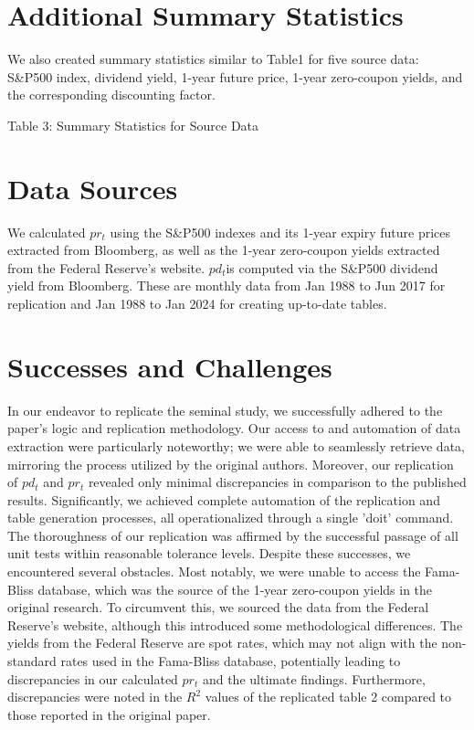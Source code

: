 \documentclass{article}
\begin{document}
\section{Additional Summary Statistics}
We also created summary statistics similar to Table1 for five source data: 
S\&P500 index, dividend yield, 1-year future price, 1-year 
zero-coupon yields, and the corresponding discounting factor.

\begin{table}[H]
\centering

\caption*{Table 3: Summary Statistics for Source Data}
\label{tab:your_label}
\end{table}    


\section{Data Sources}
We calculated \(pr_t\) using the S\&P500 indexes and its 1-year expiry 
future prices extracted from Bloomberg, as well as the 1-year zero-coupon 
yields extracted from the Federal Reserve’s website. \(pd_t \)is 
computed via the S\&P500 dividend yield from Bloomberg. These are 
monthly data from Jan 1988 to Jun 2017 for replication and Jan 1988 
to Jan 2024 for creating up-to-date tables.

\section{Successes and Challenges}
In our endeavor to replicate the seminal study, we successfully 
adhered to the paper's logic and replication methodology. Our access 
to and automation of data extraction were particularly noteworthy; 
we were able to seamlessly retrieve data, mirroring the process utilized 
by the original authors. Moreover, our replication of $pd_t$ and $pr_t$ 
revealed only minimal discrepancies in comparison to the published results. 
Significantly, we achieved complete automation of the replication and 
table generation processes, all operationalized through a single 'doit' 
command. The thoroughness of our replication was affirmed by the 
successful passage of all unit tests within reasonable tolerance levels.
\newline
\newline
Despite these successes, we encountered several obstacles. Most notably, 
we were unable to access the Fama-Bliss database, which was the 
source of the 1-year zero-coupon yields in the original research. To 
circumvent this, we sourced the data from the Federal Reserve's website, 
although this introduced some methodological differences. The yields 
from the Federal Reserve are spot rates, which may not align with the 
non-standard rates used in the Fama-Bliss database, potentially leading 
to discrepancies in our calculated $pr_t$ and the ultimate findings. 
Furthermore, discrepancies were noted in the $R^2$ values of the 
replicated table 2 compared to those reported in the original paper.
\end{document}
